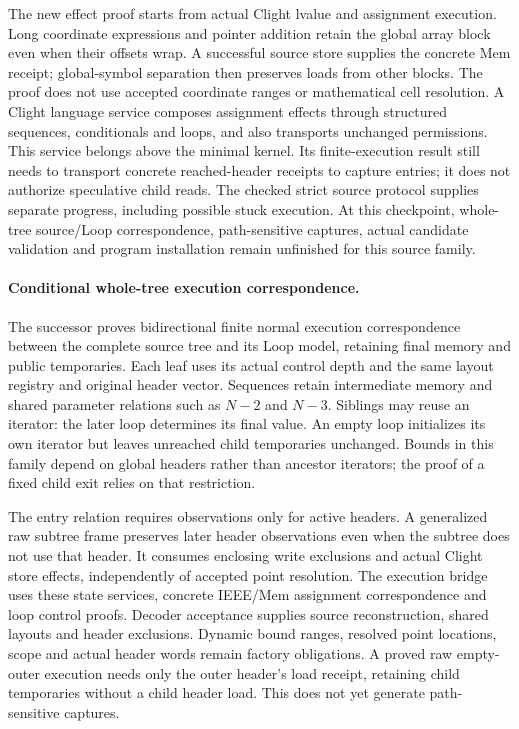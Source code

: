 The new effect proof starts from actual Clight lvalue and assignment execution.
Long coordinate expressions and pointer addition retain the global array block
even when their offsets wrap. A successful source store supplies the concrete
Mem receipt; global-symbol separation then preserves loads from other blocks.
The proof does not use accepted coordinate ranges or mathematical cell
resolution. A Clight language service composes assignment effects through
structured sequences, conditionals and loops, and also transports unchanged
permissions. This service belongs above the minimal kernel. Its finite-execution
result still needs to transport concrete reached-header receipts to capture
entries; it does not authorize speculative child reads. The checked strict
source protocol supplies separate progress, including possible stuck execution.
At this checkpoint, whole-tree source/Loop correspondence, path-sensitive
captures, actual candidate validation and program installation remain unfinished
for this source family.

\paragraph{Conditional whole-tree execution correspondence.}
The successor proves bidirectional finite normal execution correspondence between
the complete source tree and its Loop model, retaining final memory and public
temporaries. Each leaf uses its actual control depth and the same layout registry
and original header vector. Sequences retain intermediate memory and shared
parameter relations such as $N-2$ and $N-3$. Siblings may reuse an iterator:
the later loop determines its final value. An empty loop initializes its own
iterator but leaves unreached child temporaries unchanged. Bounds in this family
depend on global headers rather than ancestor iterators; the proof of a fixed
child exit relies on that restriction.

The entry relation requires observations only for active headers. A generalized
raw subtree frame preserves later header observations even when the subtree does
not use that header. It consumes enclosing write exclusions and actual Clight
store effects, independently of accepted point resolution. The execution bridge
uses these state services, concrete IEEE/Mem assignment correspondence and loop
control proofs. Decoder acceptance supplies source reconstruction, shared layouts
and header exclusions. Dynamic bound ranges, resolved point locations, scope
and actual header words remain factory obligations. A proved raw empty-outer
execution needs only the outer header's load receipt, retaining child temporaries
without a child header load. This does not yet generate path-sensitive captures.

